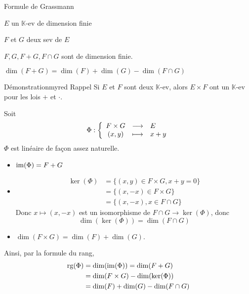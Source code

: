     \begin{theo}{Formule de Grassmann}{}
        \begin{soient}
            \item $E$ un $\mathbb{K}$-ev de dimension finie
            \item $F$ et $G$ deux sev de $E$
        \end{soient}
        \begin{alors}
            \item $F, G, F+G, F \cap G$ sont de dimension finie.
            \item $\dim(F+G) = \dim(F) + \dim(G) - \dim(F \cap G)$
        \end{alors}
    \end{theo}

    \begin{demo}{Démonstration}{myred}
        \textcolor{myred}{Rappel} \quad Si $E$ et $F$ sont deux $\mathbb{K}$-ev, alors $E \times F$ ont un $\mathbb{K}$-ev pour les lois $+$ et $\cdotp$.

        Soit 
        \[ \fonction{\Phi}{F \times G}{E}{(x,y)}{x + y} \]
        $\Phi$ est linéaire de façon assez naturelle. 
        \begin{itemize}
            \item $\operatorname{im}(\Phi) = F + G$
            \item \begin{align*}
                \ker(\Phi) 
                & = \big\{ (x,y) \in F \times G, x + y = 0 \big\} \\
                &= \big\{ (x,-x) \in F \times G \big\} \\
                &= \big\{ (x,-x), x \in F \cap G \big\}
            \end{align*}
            Donc $x \mapsto (x,-x)$ est un isomorphisme de $F \cap G \to \ker(\Phi)$, donc 
            \[ \dim(\ker(\Phi)) = \dim(F \cap G) \]
            \item $\dim(F \times G) = \dim(F) + \dim(G)$.
        \end{itemize}
        Ainsi, par la formule du rang, 
        \begin{align*}
            \operatorname{rg}(\Phi) &= \dim(\operatorname{im}(\Phi)) = \dim(F + G) \\
            &= \dim(F \times G) - \dim(\ker(\Phi)) \\
            &= \dim(F) + \dim(G) - \dim(F \cap G) 
        \end{align*}
    \end{demo}

